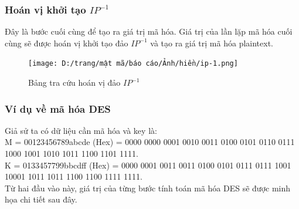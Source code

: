 \subsubsection{Hoán vị khởi tạo $IP^{-1}$}
Đây là bước cuối cùng để tạo ra giá trị mã hóa. Giá trị của lần lặp mã hóa cuối cùng sẽ được hoán vị khởi tạo đảo $IP^{-1}$ và tạo ra giá trị mã hóa plaintext.
\begin{figure}[H]
    \centering
    \texttt{[image: D:/trang/mật mã/báo cáo/Ảnh/hiền/ip-1.png]}
    \caption{Bảng tra cứu hoán vị đảo $IP^{-1}$}
\end{figure}
\subsubsection{Ví dụ về mã hóa DES}
Giả sử ta có dữ liệu cần mã hóa và key là: \\
M = 00123456789abcde (Hex) = 0000 0000 0001 0010 0011 0100 0101 0110 0111 1000 1001 1010 1011 1100 1101 1111. \\
K = 0133457799bbcdff (Hex) = 0000 0001 0011 0011 0100 0101 0111 0111 1001 10001 1011 1011 1100 1100 1111 1111.\\
Từ hai đầu vào này, giá trị của từng bước tính toán mã hóa DES sẽ được minh họa chi tiết sau đây.\cite{Khanh2014}
